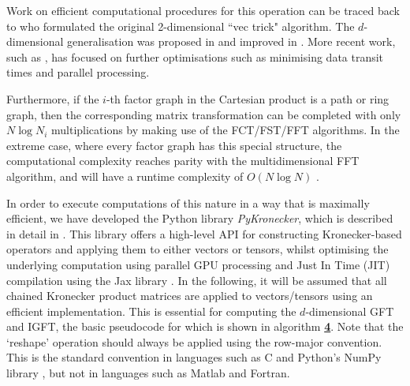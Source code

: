 Work on efficient computational procedures for this operation can be traced back to \cite{Roth1934} who formulated the original 2-dimensional ``vec trick" algorithm. The $d$-dimensional generalisation was proposed in \cite{Pereyra1973} and improved in \cite{DeBoor1979}. More recent work, such as \cite{Fackler2019}, has focused on further optimisations such as minimising data transit times and parallel processing. 

Furthermore, if the $i$-th factor graph in the Cartesian product is a path or ring graph, then the corresponding matrix transformation can be completed with only $N \log N_i$ multiplications by making use of the FCT/FST/FFT algorithms. In the extreme case, where every factor graph has this special structure, the computational complexity reaches parity with the multidimensional FFT algorithm, and will have a runtime complexity of $O(N \log N)$ \citep{Smith1995}. 

In order to execute computations of this nature in a way that is maximally efficient, we have developed the Python library \textit{PyKronecker}, which is described in detail in \cite{Antonian2023}. This library offers a high-level API for constructing Kronecker-based operators and applying them to either vectors or tensors, whilst optimising the underlying computation using parallel GPU processing and Just In Time (JIT) compilation using the Jax library \citep{Bradbury2018}. In the following, it will be assumed that all chained Kronecker product matrices are applied to vectors/tensors using an efficient implementation. This is essential for computing the $d$-dimensional GFT and IGFT, the basic pseudocode for which is shown in algorithm \hyperlink{al:GFT_dd}{\textbf{4}}. Note that the `reshape' operation should always be applied using the row-major convention. This is the standard convention in languages such as C and Python's NumPy library \citep{Harris2020}, but not in languages such as Matlab and Fortran. 

